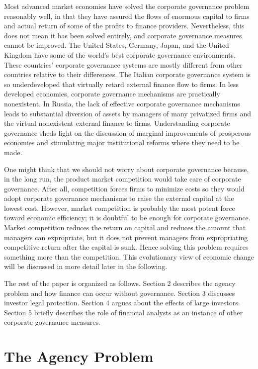 \documentclass[final,1p,authoryear]{elsarticle}
\begin{document}
Most advanced market economies have solved the corporate governance problem reasonably well, in that they have assured the flows of enormous capital to firms and actual return of some of the profits to finance providers. Nevertheless, this does not mean it has been solved entirely, and corporate governance measures cannot be improved. The United States, Germany, Japan, and the United Kingdom have some of the world's best corporate governance environments. These countries' corporate governance systems are mostly different from other countries relative to their differences. The Italian corporate governance system is so underdeveloped that virtually retard external finance flow to firms. In less developed economies, corporate governance mechanisms are practically nonexistent. In Russia, the lack of effective corporate governance mechanisms leads to substantial diversion of assets by managers of many privatized firms and the virtual nonexistent external finance to firms. Understanding corporate governance sheds light on the discussion of marginal improvements of prosperous economies and stimulating major institutional reforms where they need to be made.

One might think that we should not worry about corporate governance because, in the long run, the product market competition would take care of corporate governance. After all, competition forces firms to minimize costs so they would adopt corporate governance mechanisms to raise the external capital at the lowest cost. However, market competition is probably the most potent force toward economic efficiency; it is doubtful to be enough for corporate governance. Market competition reduces the return on capital and reduces the amount that managers can expropriate, but it does not prevent managers from expropriating competitive return after the capital is sunk. Hence solving this problem requires something more than the competition. This evolutionary view of economic change will be discussed in more detail later in the following.

The rest of the paper is organized as follows. Section 2 describes the agency problem and how finance can occur without governance. Section 3 discusses investor legal protection. Section 4 argues about the effects of large investors. Section 5 briefly describes the role of financial analysts as an instance of other corporate governance measures.


\section{The Agency Problem}
\end{document}
